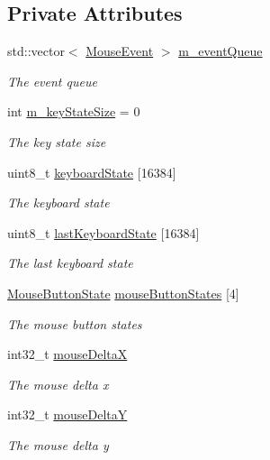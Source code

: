 \subsection*{Private Attributes}
\begin{DoxyCompactItemize}
\item 
std\+::vector$<$ \hyperlink{struct_mouse_event}{Mouse\+Event} $>$ \hyperlink{class_g_l_input_handler_ada1ba238aee9b9d4e40cbd8e6dcde471}{m\+\_\+event\+Queue}
\begin{DoxyCompactList}\small\item\em The event queue \end{DoxyCompactList}\item 
int \hyperlink{class_g_l_input_handler_afeb05710f1ab21056dd404ba6f41b4b3}{m\+\_\+key\+State\+Size} = 0
\begin{DoxyCompactList}\small\item\em The key state size \end{DoxyCompactList}\item 
uint8\+\_\+t \hyperlink{class_g_l_input_handler_a0939fc9cb14210cebfb2b5f57717cef9}{keyboard\+State} \mbox{[}16384\mbox{]}
\begin{DoxyCompactList}\small\item\em The keyboard state \end{DoxyCompactList}\item 
uint8\+\_\+t \hyperlink{class_g_l_input_handler_a578a30a739f18db64d1f6716487165f5}{last\+Keyboard\+State} \mbox{[}16384\mbox{]}
\begin{DoxyCompactList}\small\item\em The last keyboard state \end{DoxyCompactList}\item 
\hyperlink{struct_mouse_button_state}{Mouse\+Button\+State} \hyperlink{class_g_l_input_handler_a55300deac5e92292e389fdffb8403c39}{mouse\+Button\+States} \mbox{[}4\mbox{]}
\begin{DoxyCompactList}\small\item\em The mouse button states \end{DoxyCompactList}\item 
int32\+\_\+t \hyperlink{class_g_l_input_handler_a2e7df62a21583ccbfcbc9ad3073c2200}{mouse\+DeltaX}
\begin{DoxyCompactList}\small\item\em The mouse delta x \end{DoxyCompactList}\item 
int32\+\_\+t \hyperlink{class_g_l_input_handler_a9f02e037ae5162dbd73f14be2961b767}{mouse\+DeltaY}
\begin{DoxyCompactList}\small\item\em The mouse delta y \end{DoxyCompactList}\end{DoxyCompactItemize}


